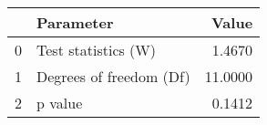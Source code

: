 \begin{tabular}{llr}
\toprule
{} &                Parameter &    Value \\
\midrule
0 &      Test statistics (W) &   1.4670 \\
1 &  Degrees of freedom (Df) &  11.0000 \\
2 &                  p value &   0.1412 \\
\bottomrule
\end{tabular}
